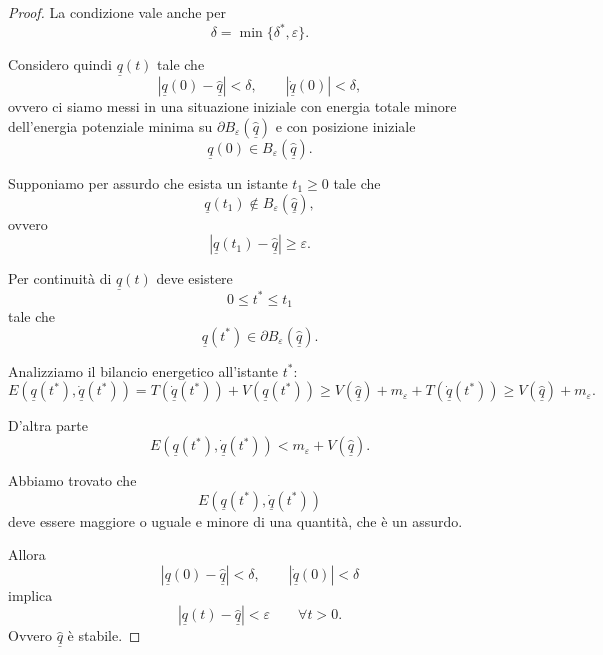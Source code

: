 \begin{proof}
La condizione vale anche per
\[
\delta=\min\{\delta^*,\varepsilon\}.
\]

Considero quindi \(\underline{q}(t)\) tale che
\[
|\underline{q}(0)-\hat{\underline{q}}|<\delta,
\qquad
|\dot{\underline{q}}(0)|<\delta,
\]
ovvero ci siamo messi in una situazione iniziale con energia totale minore
dell'energia potenziale minima su
\(\partial B_\varepsilon(\hat{\underline{q}})\) e con posizione iniziale
\[
\underline{q}(0)\in B_\varepsilon(\hat{\underline{q}}).
\]

Supponiamo per assurdo che esista un istante \(t_1\geq 0\) tale che
\[
\underline{q}(t_1)\notin B_\varepsilon(\hat{\underline{q}}),
\]
ovvero
\[
|\underline{q}(t_1)-\hat{\underline{q}}|\geq \varepsilon.
\]

Per continuità di \(\underline{q}(t)\) deve esistere
\[
0\leq t^*\leq t_1
\]
tale che
\[
\underline{q}(t^*)\in \partial B_\varepsilon(\hat{\underline{q}}).
\]

Analizziamo il bilancio energetico all'istante \(t^*\):
\[
E(\underline{q}(t^*),\dot{\underline{q}}(t^*))
=
T(\dot{\underline{q}}(t^*))
+
V(\underline{q}(t^*))
\geq
V(\hat{\underline{q}})+m_\varepsilon
+
T(\dot{\underline{q}}(t^*))
\geq
V(\hat{\underline{q}})+m_\varepsilon.
\]

D'altra parte
\[
E(\underline{q}(t^*),\dot{\underline{q}}(t^*))
<
m_\varepsilon+V(\hat{\underline{q}}).
\]

Abbiamo trovato che
\[
E(\underline{q}(t^*),\dot{\underline{q}}(t^*))
\]
deve essere maggiore o uguale e minore di una quantità, che è un assurdo.

Allora
\[
|\underline{q}(0)-\hat{\underline{q}}|<\delta,
\qquad
|\dot{\underline{q}}(0)|<\delta
\]
implica
\[
|\underline{q}(t)-\hat{\underline{q}}|<\varepsilon
\qquad
\forall t>0.
\]
Ovvero \(\hat{\underline{q}}\) è stabile.
\end{proof}

